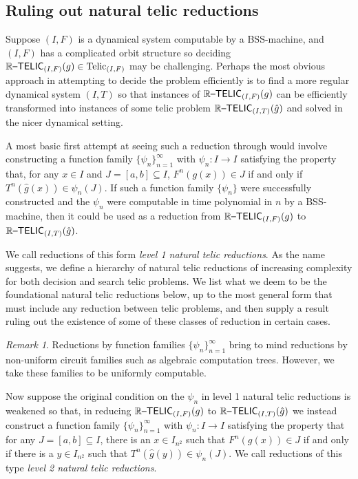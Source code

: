 \documentclass{amsart}
\theoremstyle{theorem}
\theoremstyle{remark}
\newtheorem{remark}[theorem]{Remark}
\DeclareMathOperator{\Telic}{Telic}
\newcommand{\ccRTELIC}{\mathbb{R}\textsf{\upshape --TELIC}}
\begin{document}
\subsection{Ruling out natural telic reductions}

Suppose $(I, F)$ is a dynamical system computable by a BSS-machine, and $(I, F)$ has a complicated orbit structure so deciding $\ccRTELIC_{(I, F)}(g) \in \Telic_{(I, F)}$ may be challenging. Perhaps the most obvious approach in attempting to decide the problem efficiently is to find a more regular dynamical system $(I, T)$ so that instances of $\ccRTELIC_{(I, F)}(g)$ can be efficiently transformed into instances of some telic problem $\ccRTELIC_{(I, T)}(\hat{g})$ and solved in the nicer dynamical setting.

A most basic first attempt at seeing such a reduction through would involve constructing a function family $\{\psi_n\}_{n=1}^\infty$ with $\psi_n:I\rightarrow I$ satisfying the property that, for any $x \in I$ and $J=[a, b] \subseteq I$, $F^n(g(x)) \in J$ if and only if $T^n(\hat{g}(x)) \in \psi_n(J)$.
If such a function family $\{\psi_n\}$ were successfully constructed and the $\psi_n$ were computable in time polynomial in $n$ by a BSS-machine, then it could be used as a reduction from $\ccRTELIC_{(I, F)}(g)$ to $\ccRTELIC_{(I, T)}(\hat{g})$.

We call reductions of this form \emph{level 1 natural telic reductions}.
As the name suggests, we define a hierarchy of natural telic reductions of increasing complexity for both decision and search telic problems. We list what we deem to be the foundational natural telic reductions below, up to the most general form that must include any reduction between telic problems, and then supply a result ruling out the existence of some of these classes of reduction in certain cases.

\begin{remark}
Reductions by function families $\{\psi_n\}_{n=1}^\infty$ bring to mind reductions by non-uniform circuit families such as algebraic computation trees. However, we take these families to be uniformly computable.
\end{remark}

Now suppose the original condition on the $\psi_n$ in level 1 natural telic reductions is weakened so that, in reducing $\ccRTELIC_{(I, F)}(g)$ to $\ccRTELIC_{(I, T)}(\hat{g})$ we instead construct a function family $\{\psi_n\}_{n=1}^\infty$ with $\psi_n:I\rightarrow I$ satisfying the property that for any $J=[a, b] \subseteq I$, there is an $x \in I_{n^2}$ such that $F^n(g(x)) \in J$ if and only if there is a $y \in I_{n^2}$ such that $T^n(\hat{g}(y)) \in \psi_n(J)$. We call reductions of this type \emph{level 2 natural telic reductions}.
\end{document}
